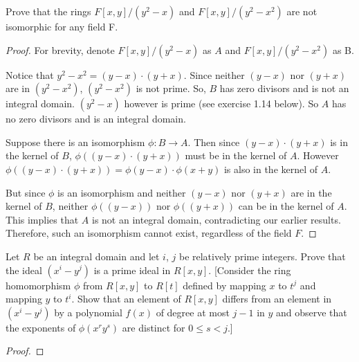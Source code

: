 \documentclass[10pt]{article}
\newenvironment{problem}[2][Problem]{\begin{trivlist}
		\item[\hskip \labelsep {\bfseries #1}\hskip \labelsep {\bfseries #2.}]}{\end{trivlist}}
\begin{document}
	\begin{problem}{1.13}
		Prove that the rings $F[x,y]/(y^2-x)$ and $F[x,y]/(y^2-x^2)$ are not isomorphic for any field F.
		\begin{proof}
			For brevity, denote $F[x,y]/(y^2-x)$ as $A$ and $F[x,y]/(y^2-x^2)$ as B.
			
			Notice that $y^2 - x^2 = (y-x) \cdot (y+x)$. Since neither $(y-x)$ nor $(y+x)$ are in $(y^2 - x^2)$, $(y^2 - x^2)$ is not prime. So, $B$ has zero divisors and is not an integral domain. $(y^2-x)$ however is prime (see exercise 1.14 below). So $A$ has no zero divisors and is an integral domain.
			
			Suppose there is an isomorphism $\phi : B \rightarrow A$. Then since $(y-x) \cdot (y+x)$ is in the kernel of $B$, $\phi((y-x) \cdot (y+x))$ must be in the kernel of $A$. However $\phi((y-x) \cdot (y+x)) = \phi(y-x) \cdot \phi(x+y)$ is also in the kernel of $A$. 
			
			But since $\phi$ is an isomorphism and neither $(y-x)$ nor $(y+x)$ are in the kernel of $B$, neither $\phi((y-x))$ nor $\phi((y+x))$ can be in the kernel of $A$. This implies that $A$ is not an integral domain, contradicting our earlier results. Therefore, such an isomorphism cannot exist, regardless of the field $F$.
		\end{proof}
	\end{problem}
	
	\begin{problem}{1.14}
		Let $R$ be an integral domain and let $i$, $j$ be relatively prime integers. Prove that the ideal $(x^i - y^j)$ is a prime ideal in $R[x,y]$. [Consider the ring homomorphism $\phi$ from $R[x,y]$ to $R[t]$ defined by mapping $x$ to $t^j$ and mapping $y$ to $t^i$. Show that an element of $R[x,y]$ differs from an element in $(x^i - y^j)$ by a polynomial $f(x)$ of degree at most $j-1$ in $y$ and observe that the exponents of $\phi(x^ry^s)$ are distinct for $0 \leq s < j$.]
		\begin{proof}
			
			
			
		\end{proof}
	\end{problem}
\end{document}
